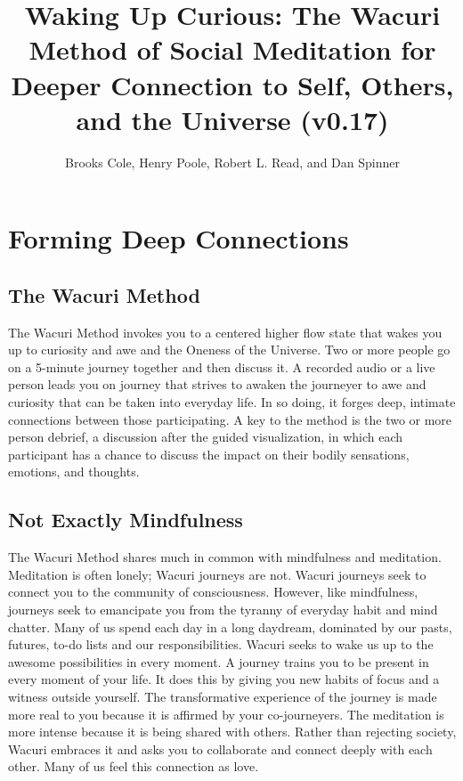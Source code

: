 \documentclass[12pt]{book}
\begin{document}
\title{Waking Up Curious: The Wacuri Method of Social Meditation for Deeper Connection to Self, Others, and the Universe (v0.17)}

\author{Brooks Cole, Henry Poole, Robert L. Read, and Dan Spinner}
\date{ }

\maketitle
\tableofcontents


\chapter{Forming Deep Connections}

\section{The Wacuri Method}

The Wacuri Method invokes  you  to a centered higher flow state that wakes you up to curiosity and awe and the Oneness of the Universe. Two or more people go on a 5-minute journey together and then discuss it. A recorded audio or a live person leads you on  journey that strives to awaken the journeyer to awe and curiosity that can be taken into everyday life. In so doing, it forges deep, intimate connections between those participating. A key to the method is the two or more person debrief, a discussion after the guided visualization, in which each participant has a chance to discuss the impact on their bodily sensations, emotions, and thoughts.


\section{Not Exactly Mindfulness}

The Wacuri Method shares much in common with mindfulness and meditation. Meditation is often lonely; Wacuri journeys are not. Wacuri journeys seek to connect you to the community of consciousness. However, like mindfulness, journeys seek to emancipate you from the tyranny of everyday habit and mind chatter. Many of us spend each day in a long daydream, dominated by our pasts, futures, to-do lists and our responsibilities. Wacuri seeks to wake us up to the awesome possibilities in every moment. A journey trains you to be present in every moment of your life. It does this by giving you new habits of focus and a witness outside yourself. The transformative experience of the journey is made more real to you because it is affirmed by your co-journeyers. The meditation is more intense because it is being shared with others. Rather than rejecting society, Wacuri embraces it and asks you to collaborate and connect deeply with each other.
Many of us feel this connection as love.
\end{document}
